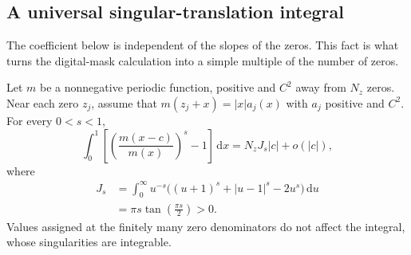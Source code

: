 \documentclass[11pt,a4paper]{article}
\numberwithin{equation}{section}
\theoremstyle{definition}
\theoremstyle{remark}
\newcommand{\dd}{\,\mathrm d}
\begin{document}
\subsection{A universal singular-translation integral}
The coefficient below is independent of the slopes of the zeros.
This fact is what turns the digital-mask calculation into a simple
multiple of the number of zeros.

\begin{lemma}
\label{lem:translation}
Let $m$ be a nonnegative periodic function, positive and $C^2$ away from
$N_z$ zeros. Near each zero $z_j$, assume that
$m(z_j+x)=|x|a_j(x)$ with $a_j$ positive and $C^2$.
For every $0<s<1$,
\begin{equation}
 \int_0^1\left[\left(\frac{m(x-c)}{m(x)}\right)^s-1\right]\dd x
 =N_zJ_s|c|+o(|c|),
 \label{eq:translation-integral}
\end{equation}
where
\begin{align}
 J_s&=\int_0^\infty
 u^{-s}\bigl((u+1)^s+|u-1|^s-2u^s\bigr)\dd u
 \label{eq:J-integral}\\
 &=\pi s\tan\left(\frac{\pi s}{2}\right)>0.
 \label{eq:J-value}
\end{align}
Values assigned at the finitely many zero denominators do not affect
the integral, whose singularities are integrable.
\end{lemma}
\end{document}

